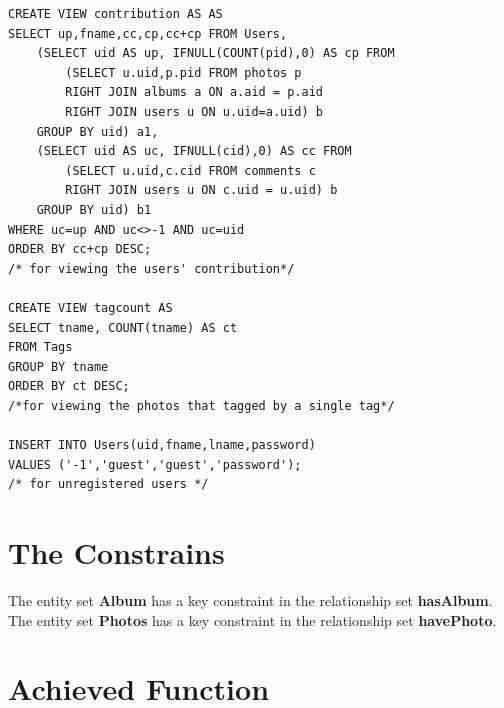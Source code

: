 \documentclass[11pt, oneside]{article}   	%
\begin{document}
\begin{lstlisting}[frame=none]
CREATE VIEW contribution AS AS 
SELECT up,fname,cc,cp,cc+cp FROM Users,
	(SELECT uid AS up, IFNULL(COUNT(pid),0) AS cp FROM
		(SELECT u.uid,p.pid FROM photos p 
		RIGHT JOIN albums a ON a.aid = p.aid 
		RIGHT JOIN users u ON u.uid=a.uid) b
	GROUP BY uid) a1,
	(SELECT uid AS uc, IFNULL(cid),0) AS cc FROM
		(SELECT u.uid,c.cid FROM comments c 
		RIGHT JOIN users u ON c.uid = u.uid) b 
	GROUP BY uid) b1
WHERE uc=up AND uc<>-1 AND uc=uid
ORDER BY cc+cp DESC;
/* for viewing the users' contribution*/

CREATE VIEW tagcount AS
SELECT tname, COUNT(tname) AS ct
FROM Tags
GROUP BY tname
ORDER BY ct DESC;
/*for viewing the photos that tagged by a single tag*/

INSERT INTO Users(uid,fname,lname,password) 
VALUES ('-1','guest','guest','password');
/* for unregistered users */

\end{lstlisting}


\section{The Constrains}
The entity set \textbf{Album} has a key constraint in the relationship set \textbf{hasAlbum}.\\
The entity set \textbf{Photos} has a key constraint in the relationship set \textbf{havePhoto}.

\section{Achieved Function}
\end{document}
